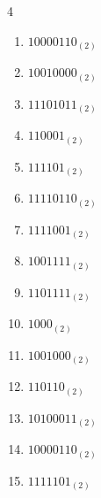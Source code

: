 \begin{multicols}{4}
\begin{enumerate}
        \phantom{$=164$}

  \item $10000110_{(2)}$

        \phantom{$=134$}

\columnbreak %

\resetques

  \item $10010000_{(2)}$

        \phantom{$=144$}

  \item $11101011_{(2)}$

        \phantom{$=235$}

  \item $110001_{(2)}$

        \phantom{$=49$}

  \item $111101_{(2)}$

        \phantom{$=61$}

  \item $11110110_{(2)}$

        \phantom{$=246$}

  \item $1111001_{(2)}$

        \phantom{$=121$}

  \item $1001111_{(2)}$

        \phantom{$=79$}

  \item $1101111_{(2)}$

        \phantom{$=111$}

  \item $1000_{(2)}$

        \phantom{$=8$}

  \item $1001000_{(2)}$

        \phantom{$=72$}

  \item $110110_{(2)}$

        \phantom{$=54$}

  \item $10100011_{(2)}$

        \phantom{$=163$}

  \item $10000110_{(2)}$

        \phantom{$=134$}

  \item $1111101_{(2)}$


\end{enumerate}
\end{multicols}
